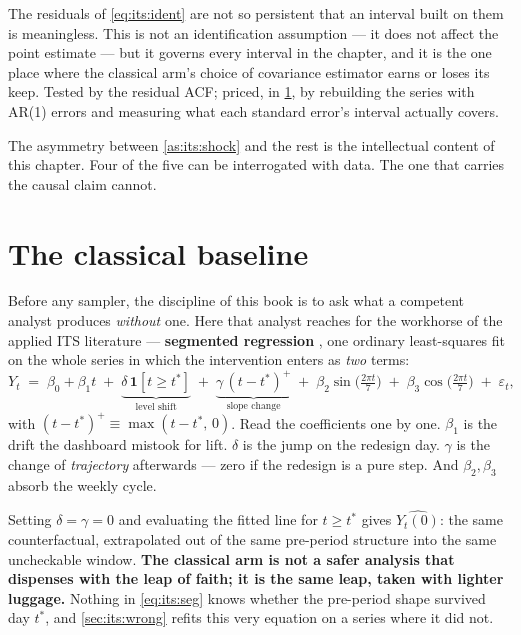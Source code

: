 \begin{assumption}\label{as:its:dep}
The residuals of \cref{eq:its:ident} are not so persistent that an interval built on them is
meaningless. This is not an identification assumption --- it does not affect the point estimate ---
but it governs every interval in the chapter, and it is the one place where the classical arm's
choice of covariance estimator earns or loses its keep. Tested by the residual ACF; priced, in
\cref{sec:its:classical}, by rebuilding the series with AR(1) errors and measuring what each
standard error's interval actually covers.
\end{assumption}

The asymmetry between \cref{as:its:shock} and the rest is the intellectual content of this
chapter. Four of the five can be interrogated with data. The one that carries the causal claim
cannot.

\section{The classical baseline}
\label{sec:its:classical}

Before any sampler, the discipline of this book is to ask what a competent analyst produces
\emph{without} one. Here that analyst reaches for the workhorse of the applied ITS literature ---
\textbf{segmented regression} \citep{wagner2002, bernal2017}, one ordinary least-squares fit on the
whole series in which the intervention enters as \emph{two} terms:
%
\begin{equation}
  Y_t \;=\; \beta_0 + \beta_1 t
        \;+\; \underbrace{\delta\,\mathbf 1[t \ge t^{*}]}_{\text{level shift}}
        \;+\; \underbrace{\gamma\,(t - t^{*})^{+}}_{\text{slope change}}
        \;+\; \beta_2 \sin\!\Big(\tfrac{2\pi t}{7}\Big)
        \;+\; \beta_3 \cos\!\Big(\tfrac{2\pi t}{7}\Big)
        \;+\; \varepsilon_t ,
  \label{eq:its:seg}
\end{equation}
%
with $(t - t^{*})^{+} \equiv \max(t - t^{*},\, 0)$. Read the coefficients one by one. $\beta_1$ is
the drift the dashboard mistook for lift. $\delta$ is the jump on the redesign day. $\gamma$ is
the change of \emph{trajectory} afterwards --- zero if the redesign is a pure step. And
$\beta_2, \beta_3$ absorb the weekly cycle.

Setting $\delta = \gamma = 0$ and evaluating the fitted line for $t \ge t^{*}$ gives
$\widehat{Y_t(0)}$: the same counterfactual, extrapolated out of the same pre-period structure into
the same uncheckable window. \textbf{The classical arm is not a safer analysis that dispenses with
the leap of faith; it is the same leap, taken with lighter luggage.} Nothing in \cref{eq:its:seg}
knows whether the pre-period shape survived day $t^{*}$, and \cref{sec:its:wrong} refits this very
equation on a series where it did not.

